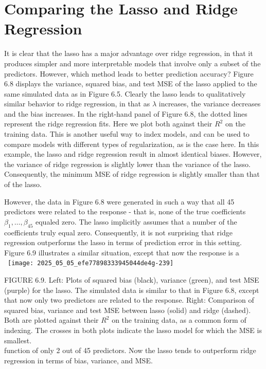 \documentclass[10pt]{article}
\begin{document}
\section*{Comparing the Lasso and Ridge Regression}
It is clear that the lasso has a major advantage over ridge regression, in that it produces simpler and more interpretable models that involve only a subset of the predictors. However, which method leads to better prediction accuracy? Figure 6.8 displays the variance, squared bias, and test MSE of the lasso applied to the same simulated data as in Figure 6.5. Clearly the lasso leads to qualitatively similar behavior to ridge regression, in that as $\lambda$ increases, the variance decreases and the bias increases. In the right-hand panel of Figure 6.8, the dotted lines represent the ridge regression fits. Here we plot both against their $R^{2}$ on the training data. This is another useful way to index models, and can be used to compare models with different types of regularization, as is the case here. In this example, the lasso and ridge regression result in almost identical biases. However, the variance of ridge regression is slightly lower than the variance of the lasso. Consequently, the minimum MSE of ridge regression is slightly smaller than that of the lasso.

However, the data in Figure 6.8 were generated in such a way that all 45 predictors were related to the response - that is, none of the true coefficients $\beta_{1}, \ldots, \beta_{45}$ equaled zero. The lasso implicitly assumes that a number of the coefficients truly equal zero. Consequently, it is not surprising that ridge regression outperforms the lasso in terms of prediction error in this setting. Figure 6.9 illustrates a similar situation, except that now the response is a\
\
\texttt{[image: 2025\_05\_05\_efe77898333945044de4g-239]}

FIGURE 6.9. Left: Plots of squared bias (black), variance (green), and test MSE (purple) for the lasso. The simulated data is similar to that in Figure 6.8, except that now only two predictors are related to the response. Right: Comparison of squared bias, variance and test MSE between lasso (solid) and ridge (dashed). Both are plotted against their $R^{2}$ on the training data, as a common form of indexing. The crosses in both plots indicate the lasso model for which the MSE is smallest.\\
function of only 2 out of 45 predictors. Now the lasso tends to outperform ridge regression in terms of bias, variance, and MSE.
\end{document}
